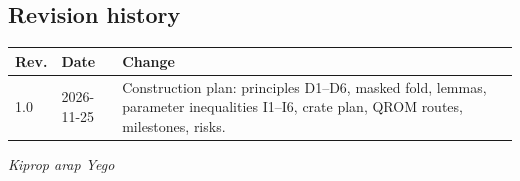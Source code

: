 \documentclass[11pt]{article}
\renewcommand{\_}{\textunderscore\allowbreak{}}
\theoremstyle{definition}
\begin{document}
\subsection*{Revision history}
\begin{tabular}{@{}p{}p{}p{}@{}}
\toprule
\textbf{Rev.} & \textbf{Date} & \textbf{Change}\\
\midrule
1.0 & 2026-11-25 & Construction plan: principles D1--D6, masked fold, lemmas, parameter inequalities I1--I6, crate plan, QROM routes, milestones, risks.\\
\bottomrule
\end{tabular}

\vfill
\begin{center}\textit{Kiprop arap Yego}\end{center}
\end{document}
